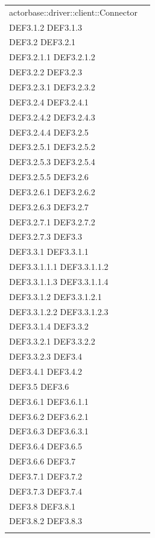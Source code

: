 \documentclass{scalatekids-article}
\begin{document}
\begin{longtable}[H]{|p{12cm}|p{5.5cm}|}
  actorbase::driver::client::Connector & \multiLineCell[t]{DEF3.1 DEF3.1.1\\DEF3.1.2 DEF3.1.3\\DEF3.2 DEF3.2.1\\DEF3.2.1.1 DEF3.2.1.2\\DEF3.2.2 DEF3.2.3\\DEF3.2.3.1 DEF3.2.3.2\\DEF3.2.4 DEF3.2.4.1\\DEF3.2.4.2 DEF3.2.4.3\\DEF3.2.4.4 DEF3.2.5\\DEF3.2.5.1 DEF3.2.5.2\\DEF3.2.5.3 DEF3.2.5.4\\DEF3.2.5.5 DEF3.2.6\\DEF3.2.6.1 DEF3.2.6.2\\DEF3.2.6.3 DEF3.2.7\\DEF3.2.7.1 DEF3.2.7.2\\DEF3.2.7.3 DEF3.3\\DEF3.3.1 DEF3.3.1.1\\DEF3.3.1.1.1 DEF3.3.1.1.2\\DEF3.3.1.1.3 DEF3.3.1.1.4\\DEF3.3.1.2 DEF3.3.1.2.1\\DEF3.3.1.2.2 DEF3.3.1.2.3\\DEF3.3.1.4 DEF3.3.2\\DEF3.3.2.1 DEF3.3.2.2\\DEF3.3.2.3 DEF3.4\\DEF3.4.1 DEF3.4.2\\DEF3.5 DEF3.6\\DEF3.6.1 DEF3.6.1.1\\DEF3.6.2 DEF3.6.2.1\\DEF3.6.3 DEF3.6.3.1\\DEF3.6.4 DEF3.6.5\\DEF3.6.6 DEF3.7\\DEF3.7.1 DEF3.7.2\\DEF3.7.3 DEF3.7.4\\DEF3.8 DEF3.8.1\\DEF3.8.2 DEF3.8.3\\}\\
  \hline

\end{longtable}
\end{document}
